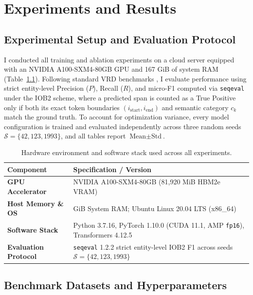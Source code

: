 \chapter{Experiments and Results}
\label{chap:live experiments}

\section{Experimental Setup and Evaluation Protocol}
\label{sec:exp_environment}

I conducted all training and ablation experiments on a cloud server equipped with an NVIDIA A100-SXM4-80GB GPU and 167 GiB of system RAM (Table~\ref{tab:hardware_software_env}). Following standard VRD benchmarks \cite{huang2022layoutlmv3}, I evaluate performance using strict entity-level Precision ($P$), Recall ($R$), and micro-F1 computed via \texttt{seqeval} under the IOB2 scheme, where a predicted span is counted as a True Positive only if both its exact token boundaries $(i_{\text{start}}, i_{\text{end}})$ and semantic category $c_k$ match the ground truth. To account for optimization variance, every model configuration is trained and evaluated independently across three random seeds $\mathcal{S} = \{42, 123, 1993\}$, and all tables report $\text{Mean} \pm \text{Std}$.

\begin{table}[htbp]
\centering
\small
\caption{Hardware environment and software stack used across all experiments.}
\label{tab:hardware_software_env}
\renewcommand{\arraystretch}{1.18}
\begin{tabularx}{\textwidth}{|>{\bfseries\RaggedRight\arraybackslash}p{4.2cm}|>{\RaggedRight\arraybackslash}X|}
\hline
\textbf{Component} & \textbf{Specification / Version} \\ \hline
GPU Accelerator & NVIDIA A100-SXM4-80GB (81,920 MiB HBM2e VRAM) \\ \hline
Host Memory \& OS & 167 GiB System RAM; Ubuntu Linux 20.04 LTS (x86\_64) \\ \hline
Software Stack & Python 3.7.16, PyTorch 1.10.0 (CUDA 11.1, AMP \texttt{fp16}), Transformers 4.12.5 \\ \hline
Evaluation Protocol & \texttt{seqeval} 1.2.2 strict entity-level IOB2 F1 across seeds $\mathcal{S} = \{42, 123, 1993\}$ \\ \hline
\end{tabularx}
\end{table}

\section{Benchmark Datasets and Hyperparameters}
\label{sec:exp_datasets}

